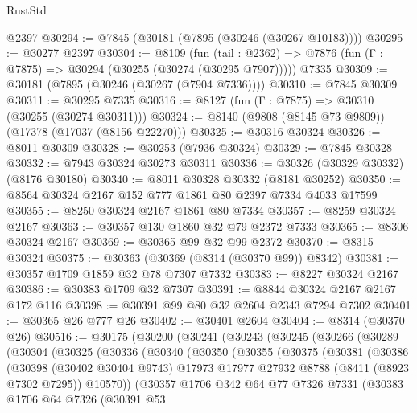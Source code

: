 \begin{lexlean}{RustStd}
\begin{coremodule}
    @2397
@30294 := @7845 (@30181 (@7895 (@30246 (@30267 @10183))))
@30295 := @30277 @2397
@30304 := @8109
    (fun (tail : @2362) => @7876 (fun (Γ : @7875) => @30294 (@30255 (@30274 (@30295 @7907)))))
    @7335
@30309 := @30181 (@7895 (@30246 (@30267 (@7904 @7336))))
@30310 := @7845 @30309
@30311 := @30295 @7335
@30316 := @8127 (fun (Γ : @7875) => @30310 (@30255 (@30274 @30311)))
@30324 := @8140 (@9808 (@8145 @73 @9809)) (@17378 (@17037 (@8156 @22270)))
@30325 := @30316 @30324
@30326 := @8011 @30309
@30328 := @30253 (@7936 @30324)
@30329 := @7845 @30328
@30332 := @7943 @30324 @30273 @30311
@30336 := @30326 (@30329 @30332) (@8176 @30180)
@30340 := @8011 @30328 @30332 (@8181 @30252)
@30350 := @8564 @30324 @2167 @152 @777 @1861 @80 @2397 @7334 @4033 @17599
@30355 := @8250 @30324 @2167 @1861 @80 @7334
@30357 := @8259 @30324 @2167
@30363 := @30357 @130 @1860 @32 @79 @2372 @7333
@30365 := @8306 @30324 @2167
@30369 := @30365 @99 @32 @99 @2372
@30370 := @8315 @30324
@30375 := @30363 (@30369 (@8314 (@30370 @99)) @8342)
@30381 := @30357 @1709 @1859 @32 @78 @7307 @7332
@30383 := @8227 @30324 @2167
@30386 := @30383 @1709 @32 @7307
@30391 := @8844 @30324 @2167 @2167 @172 @116
@30398 := @30391 @99 @80 @32 @2604 @2343 @7294 @7302
@30401 := @30365 @26 @777 @26
@30402 := @30401 @2604
@30404 := @8314 (@30370 @26)
@30516 := @30175
    (@30200
      (@30241
        (@30243
          (@30245
            (@30266
              (@30289
                (@30304
                  (@30325
                    (@30336
                      (@30340
                        (@30350
                          (@30355
                            (@30375
                              (@30381
                                (@30386
                                  (@30398
                                    (@30402 @30404 @9743)
                                    @17973
                                    @17977
                                    @27932
                                    @8788
                                    (@8411 (@8923 @7302 @7295))
                                    @10570))
                                (@30357
                                  @1706
                                  @342
                                  @64
                                  @77
                                  @7326
                                  @7331
                                  (@30383
                                    @1706
                                    @64
                                    @7326
                                    (@30391
                                      @53

\end{coremodule}
\end{lexlean}
